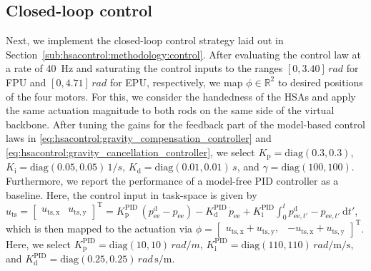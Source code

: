 \subsection{Closed-loop control}
Next, we implement the closed-loop control strategy laid out in Section~\ref{sub:hsacontrol:methodology:control}.
After evaluating the control law at a rate of \SI{40}{Hz} and saturating the control inputs to the ranges $[0, 3.40] \, \si{rad}$ for FPU and $[0, 4.71] \, \si{rad}$ for EPU, respectively, we map $\phi \in \mathbb{R}^2$ to desired positions of the four motors. For this, we consider the handedness of the \glspl{HSA} and apply the same actuation magnitude to both rods on the same side of the virtual backbone.
After tuning the gains for the feedback part of the model-based control laws in \eqref{eq:hsacontrol:gravity_compensation_controller} and \eqref{eq:hsacontrol:gravity_cancellation_controller}, we select $K_\mathrm{p} = \mathrm{diag}(0.3, 0.3)$, $K_\mathrm{i} = \mathrm{diag}(0.05, 0.05) \, \si{1 \per s}$, $K_\mathrm{d} = \mathrm{diag}(0.01, 0.01) \, \si{s}$, and $\gamma = \mathrm{diag}(100, 100)$. 
Furthermore, we report the performance of a model-free PID controller as a baseline. Here, the control input in task-space is given by $u_\mathrm{ts} = \begin{bmatrix}u_\mathrm{ts,x} & u_\mathrm{ts,y}\end{bmatrix}^\mathrm{T} = K_\mathrm{p}^\mathrm{PID} \, (p_\mathrm{ee}^\mathrm{d}-p_\mathrm{ee}) - K_\mathrm{d}^\mathrm{PID} \, \dot{p}_\mathrm{ee} + K_\mathrm{i}^\mathrm{PID} \int_0^t p_{\mathrm{ee},t'}^\mathrm{d} - p_{\mathrm{ee},t'} \: \mathrm{d}t'$, which is then mapped to the actuation via $\phi = \begin{bmatrix}
    u_\mathrm{ts,x}+u_\mathrm{ts,y}, & -u_\mathrm{ts,x}+u_\mathrm{ts,y}
\end{bmatrix}^\mathrm{T}$.
Here, we select $K_\mathrm{p}^\mathrm{PID} = \mathrm{diag}(10, 10) \, \si{rad \per m}$, $ K_\mathrm{i}^\mathrm{PID} = \mathrm{diag}(110, 110) \, \si{rad \per \meter \per \second}$, and $ K_\mathrm{d}^\mathrm{PID} = \mathrm{diag}(0.25, 0.25) \, \si{rad \, \second \per \meter}$.
\\

